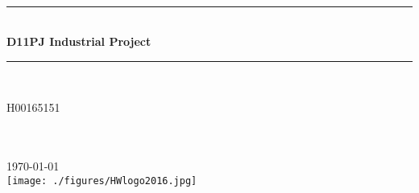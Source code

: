 \documentclass[11pt, oneside]{Thesis} %
\begin{document}
\frontmatter %


\fancyhead{} %
\rhead{\thepage} %
\lhead{} %

\pagestyle{fancy} %

\newcommand{\HRule}{\rule{\linewidth}{0.5mm}} %

\hypersetup{pdfsubject=\subjectname}
\hypersetup{pdfauthor=\authornames}
\hypersetup{pdfkeywords=\keywordnames}


\begin{titlepage}
\begin{center}

\textsc{\LARGE \univname}\\[1.5cm] %

\HRule \\[0.4cm] %
{\LARGE \bfseries {D11PJ Industrial Project}}\\[0.4cm] %
\HRule \\[1.5cm] %
 
\vfill
 
H00165151
\\ \authornames %
 
\large \textit{\degreename}\\[0.3cm] %

\deptname\\[1cm] %
 
{\large {} \today}\\[1cm] %
\texttt{[image: ./figures/HWlogo2016.jpg]} %
 
\vfill
\end{center}

\end{titlepage}
\end{document}
